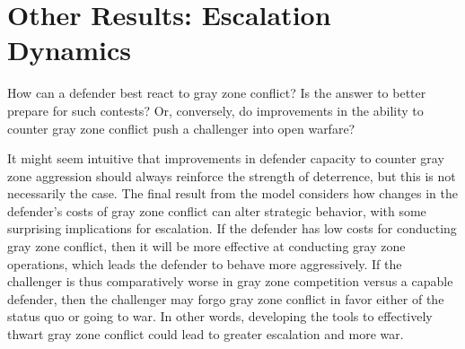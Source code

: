 \documentclass[bibtex, autowc]{apsr_submission}
\begin{document}
\section{Other Results: Escalation Dynamics}\label{gzdefense}
How can a defender best react to gray zone conflict? Is the answer to better prepare for such contests? Or, conversely, do improvements in the ability to counter gray zone conflict push a challenger into open warfare?

It might seem intuitive that improvements in defender capacity to counter gray zone aggression should always reinforce the strength of deterrence, but this is not necessarily the case. The final result from the model considers how changes in the defender's costs of gray zone conflict can alter strategic behavior, with some surprising implications for escalation. If the defender has low costs for conducting gray zone conflict, then it will be more effective at conducting gray zone operations, which leads the defender to behave more aggressively. If the challenger is thus comparatively worse in gray zone competition versus a capable defender, then the challenger may forgo gray zone conflict in favor either of the status quo or going to war. In other words, developing the tools to effectively thwart gray zone conflict could lead to greater escalation and more war. 
\end{document}
